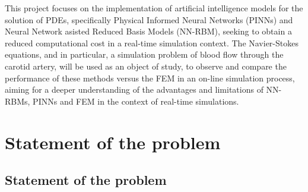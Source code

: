 \documentclass[12pt,letterpaper]{article}
\begin{document}

This project focuses on the implementation of artificial intelligence models for the solution of 
PDEs, specifically Physical Informed Neural Networks (PINNs) and Neural Network asisted Reduced 
Basis Models (NN-RBM), seeking to obtain a reduced computational cost in a real-time simulation 
context. The Navier-Stokes equations, and in particular, a simulation problem of blood flow through 
the carotid artery, will be used as an object of study, to observe and compare the performance of 
these methods versus the FEM in an on-line simulation process, aiming for a deeper understanding of the advantages and limitations of NN-RBMs, PINNs and FEM in the context of real-time simulations.

\section{Statement of the problem}



\subsection{Statement of the problem}
\end{document}
